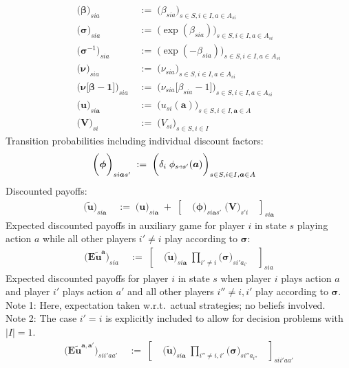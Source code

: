 \documentclass[11pt,fleqn]{article}
\newcommand{\bsigma}{\bm{\sigma}}
\newcommand{\bbeta}{\bm{\beta}}
\newcommand{\bV}{\bm{V}}
\newcommand{\bnu}{\bm{\nu}}
\newcommand{\bone}{\bm{1}}
\newcommand{\ba}{\bm{a}}
\newcommand{\tu}{\tilde{u}}
\newcommand{\shortrightarrow}{\parbox{4pt}{\tikz{\draw[->](0,0)--(4pt,0);}}}
\newcommand{\phiss}{\phi_{s\shortrightarrow s'}}
\begin{document}
\begin{align*}
	\biggl( \bbeta \biggr)_{sia} & \;:=\; \biggl( \beta_{sia} \biggr)_{s\in S, i\in I,a \in A_{si}} \\
	\biggl( \bsigma \biggr)_{sia} & \;:=\; \biggl( \exp(\beta_{sia}) \biggr)_{s\in S, i\in I,a \in A_{si}} \\
	\biggl( \bsigma^{-1} \biggr)_{sia} & \;:=\; \biggl( \exp(-\beta_{sia}) \biggr)_{s\in S, i\in I,a \in A_{si}} \\
	\biggl( \bnu \biggr)_{sia} & \;:=\; \biggl( \nu_{sia} \biggr)_{s\in S, i\in I, a\in A_{si}} \\
	\biggl( \bnu\bigl[\bbeta-\bone\bigr] \biggr)_{sia} & \;:=\; \biggl( \nu_{sia}\bigl[\beta_{sia}-1\bigr] \biggr)_{s\in S, i\in I, a\in A_{si}} \\
	\biggl( \bm{u} \biggr)_{si\ba} & \;:=\; \biggl( u_{si}(\ba) \biggr)_{s\in S, i\in I, \ba\in A} \\
	\biggl( \bV \biggr)_{si} & \;:=\; \biggl( V_{si} \biggr)_{s\in S, i\in I}
\end{align*}
Transition probabilities including individual discount factors:
\begin{align*}
	\biggl( \bm{\phi} \biggr)_{si\ba s'} & \;:=\; \biggl( \delta_i \; \phiss(\ba) \biggr)_{s\in S, i\in I, \ba\in A}
\end{align*}
Discounted payoffs:
\begin{align*}
	\biggl( \bm{{\tu}} \biggr)_{si\ba} & \;:=\; \biggl( \bm{u} \biggr)_{si\ba} \;+\; \left[ \quad \biggl( \bm{\phi} \biggr)_{si\ba s'} \; \biggl( \bV \biggr)_{s'i} \quad \right]_{si\ba}
\end{align*}
Expected discounted payoffs in auxiliary game for player $i$ in state $s$ playing action $a$ while all other players $i'\neq i$ play according to $\bsigma$:
\begin{align*}
	\biggl( \bm{{E\tu^{a}}} \biggr)_{sia} & \;:=\; \left[ \quad \biggl( \bm{{\tu}} \biggr)_{si\ba} \; \prod\limits_{i'\neq i} \biggl( \bsigma \biggr)_{si'a_{i'}} \quad \right]_{sia}
\end{align*}
Expected discounted payoffs for player $i$ in state $s$ when player $i$ plays action $a$ and player $i'$ plays action $a'$ and all other players $i'' \neq i, i'$ play according to $\bsigma$. \\
Note 1: Here, expectation taken w.r.t.\ actual strategies; no beliefs involved. \\
Note 2: The case $i'=i$ is explicitly included to allow for decision problems with $|I|=1$.
\begin{align*}
	\biggl( \bm{{E\tu^{a,a'}}} \biggr)_{sii'aa'} & \;:=\; \left[ \quad \biggl( \bm{{\tu}} \biggr)_{si\ba} \; \prod\limits_{i''\neq i,i'} \biggl( \bsigma \biggr)_{si''a_{i''}} \quad \right]_{sii'aa'}
\end{align*} 
\end{document}
